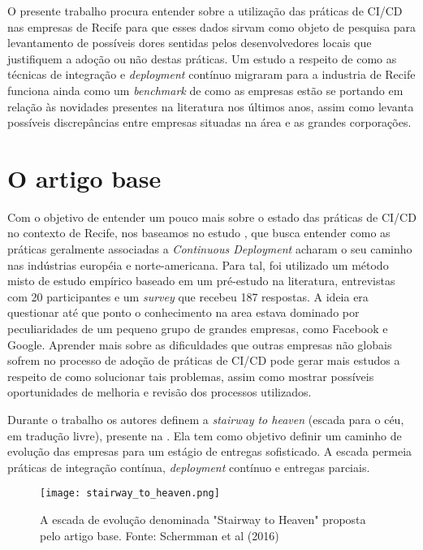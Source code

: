 O presente trabalho procura entender sobre a utilização das práticas de CI/CD nas empresas de Recife para que esses dados sirvam como objeto de pesquisa para levantamento de possíveis dores sentidas pelos desenvolvedores locais que justifiquem a adoção ou não destas práticas. Um estudo a respeito de como as técnicas de integração e \emph{deployment} contínuo migraram para a industria de Recife funciona ainda como um \emph{benchmark} de como as empresas estão se portando em relação às novidades presentes na literatura nos últimos anos, assim como levanta possíveis discrepâncias entre empresas situadas na área e as grandes corporações. 


\section{O artigo base}
Com o objetivo de entender um pouco mais sobre o estado das práticas de CI/CD no contexto de Recife, nos baseamos no estudo \cite{empiricalStudy2016}, que busca entender como as práticas geralmente associadas a \emph{Continuous Deployment} acharam o seu caminho nas indústrias européia e norte-americana. Para tal, foi utilizado um método misto de estudo empírico baseado em um pré-estudo na literatura, entrevistas com 20 participantes e um \emph{survey} que recebeu 187 respostas. A ideia era questionar até que ponto o conhecimento na area estava dominado por peculiaridades de um pequeno grupo de grandes empresas, como Facebook e Google. Aprender mais sobre as dificuldades que outras empresas não globais sofrem no processo de adoção de práticas de CI/CD pode gerar mais estudos a respeito de como solucionar tais problemas, assim como mostrar possíveis oportunidades de melhoria e revisão dos processos utilizados.

Durante o trabalho os autores definem a \emph{stairway to heaven} (escada para o céu, em tradução livre), presente na . Ela tem como objetivo definir um caminho de evolução das empresas para um estágio de entregas sofisticado. A escada permeia práticas de integração contínua, \emph{deployment} contínuo e entregas parciais.

\begin{figure}[ht]
\begin{center}
\texttt{[image: stairway\_to\_heaven.png]}
\end{center}
\caption[Stairway to Heaven]{
    A escada de evolução denominada "Stairway to Heaven" proposta pelo artigo base.
    Fonte: Schermman et al (2016)
}\label{stairway}

\end{figure}

